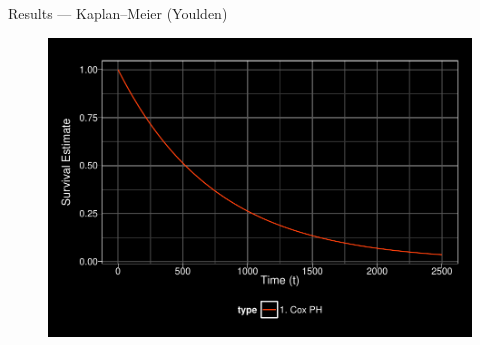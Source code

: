 \documentclass[12pt,t,handout]{beamer}
\begin{document}

\begin{frame}[c]{Results --- Kaplan--Meier (Youlden)}

\begin{center}
\begin{figure}[H]
\begin{center}
\includegraphics[width=\textwidth]{Figs/s1_cox.pdf}
\end{center}
\end{figure}
\end{center}

\note{
}

\end{frame}

\end{document}
